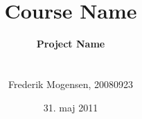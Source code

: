 \documentclass[a4paper,11pt,article,oneside,final]{memoir}
\title{Course Name}
\author{
		{\noindent\HUGE\bfseries Project Name} \\ \\ \\
		Frederik Mogensen, 20080923 \\
}
\date{31. maj 2011}
\begin{document}
	\sloppy
	\maketitle

	\newpage
	\tableofcontents
	\cleardoublepage

	


% 	


\end{document}
